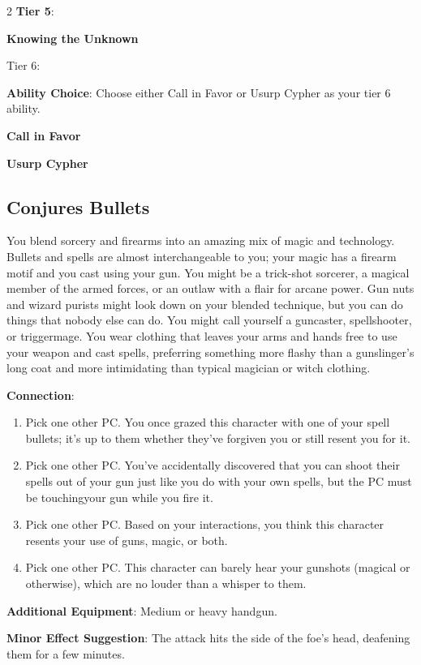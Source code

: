 \begin{multicols}{2}
\textbf{Tier 5}:

\textbf{Knowing the Unknown} 

Tier 6:

\textbf{Ability Choice}: Choose either Call in Favor or Usurp Cypher as your tier 6 ability.

\textbf{Call in Favor} 

\textbf{Usurp Cypher}

\subsection{Conjures Bullets}

You blend sorcery and firearms into an amazing mix of magic and technology. Bullets and spells are almost interchangeable to you; your magic has a firearm motif and you cast using your gun. You might be a trick-shot sorcerer, a magical member of the armed forces, or an outlaw with a flair for arcane power. Gun nuts and wizard purists might look down on your blended technique, but you can do things that nobody else can do. You might call yourself a guncaster, spellshooter, or triggermage. You wear clothing that leaves your arms and hands free to use your weapon and cast spells, preferring something more flashy than a gunslinger’s long coat and more intimidating than typical magician or witch clothing.

\textbf{Connection}:
\begin{enumerate} 
\item Pick one other PC. You once grazed this character with one of your spell bullets; it’s up to them whether they’ve forgiven you or still resent you for it.
\item Pick one other PC. You’ve accidentally discovered that you can shoot their spells out of your gun just like you do with your own spells, but the PC must be touchingyour gun while you fire it.
\item Pick one other PC. Based on your interactions, you think this character resents your use of guns, magic, or both.
\item Pick one other PC. This character can barely hear your gunshots (magical or otherwise), which are no louder than a whisper to them.
\end{enumerate}

\textbf{Additional Equipment}: Medium or heavy handgun.

\textbf{Minor Effect Suggestion}: The attack hits the side of the foe’s head, deafening them for a few minutes.


\end{multicols}
